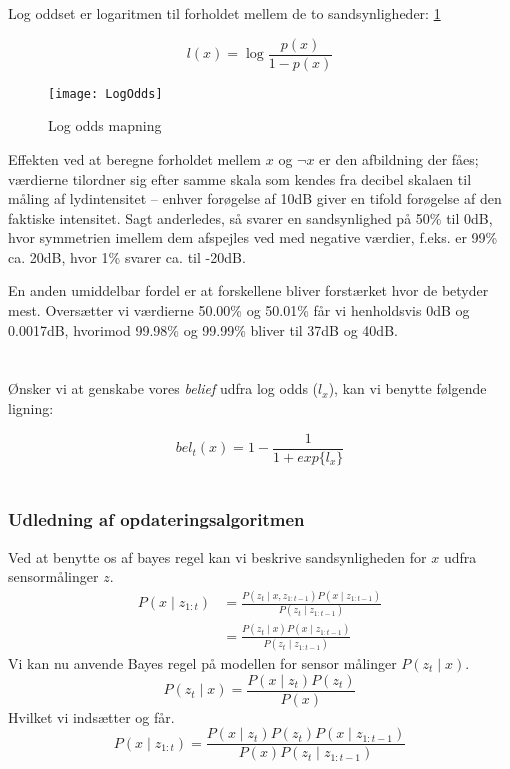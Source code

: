 Log oddset er logaritmen til forholdet mellem de to sandsynligheder: \cref{logoddsimg}

\begin{equation}
l(x) = \log \frac{p(x)}{1 - p(x)}
\end{equation}

\begin{figure}
\centering \texttt{[image: LogOdds]}
\label{logoddsimg}
\caption{Log odds mapning}
\end{figure}

Effekten ved at beregne forholdet mellem $x$ og $\neg x$ er den afbildning der fåes; værdierne tilordner sig efter samme skala som kendes fra decibel skalaen til måling af lydintensitet -- enhver forøgelse af 10dB giver en tifold forøgelse af den faktiske intensitet.
Sagt anderledes, så svarer en sandsynlighed på 50\% til 0dB, hvor symmetrien imellem dem afspejles ved med negative værdier, f.eks. er 99\% ca. 20dB, hvor 1\% svarer ca. til -20dB.

En anden umiddelbar fordel er at forskellene bliver forstærket hvor de betyder mest.
Oversætter vi værdierne 50.00\% og 50.01\% får vi henholdsvis 0dB og 0.0017dB, hvorimod 99.98\% og 99.99\% bliver til 37dB og 40dB. \\ \\
\cite[s. 2]{logodds} \\

Ønsker vi at genskabe vores \textit{belief} udfra log odds ($l_x$), kan vi benytte følgende ligning:

\begin{equation}
bel_t(x) = 1 - \frac{1}{1 + exp\{l_x\}}
\end{equation}
 \\
\cite[s. 95]{probabilisticRobotics} 

\subsubsection{Udledning af opdateringsalgoritmen}
Ved at benytte os af bayes regel kan vi beskrive sandsynligheden for $x$ udfra sensormålinger $z$.
\begin{equation}
\begin{split}
	P(x \mid z_{1:t}) &= \frac{P(z_t \mid x, z_{1:t-1}) P(x \mid z_{1:t-1})}{P(z_t \mid z_{1:t-1})} \\
	&= \frac{P(z_t \mid x) P(x \mid z_{1:t-1})}{P(z_t \mid z_{1:t-1})}
\end{split}
\end{equation}
Vi kan nu anvende Bayes regel på modellen for sensor målinger $P(z_t \mid x)$.
\begin{equation}
P(z_t \mid x) = \frac{P(x \mid z_t) P(z_t)}{P(x)}
\end{equation}
Hvilket vi indsætter og får.
\begin{equation}
P(x \mid z_{1:t}) = \frac{P(x \mid z_t) P(z_t) P(x \mid z_{1:t-1})}{P(x) P(z_t \mid z_{1:t-1})}
\end{equation}
 \\
\cite[s. 95]{probabilisticRobotics} \\

